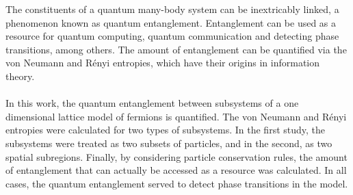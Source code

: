 \begin{singlespace}
The constituents of a quantum many-body system can be inextricably linked, a phenomenon known as quantum entanglement. Entanglement can be used as a resource for quantum computing, quantum communication and detecting phase transitions, among others. The amount of entanglement can be quantified via the von Neumann and R\'enyi entropies, which have their origins in information theory.
\\
\\
In this work, the quantum entanglement between subsystems of a one dimensional lattice model of fermions is quantified. The von Neumann and R\'enyi entropies were calculated for two types of subsystems. In the first study, the subsystems were treated as two subsets of particles, and in the second, as two spatial subregions. Finally, by considering particle conservation rules, the amount of entanglement that can actually be accessed as a resource was calculated. In all cases, the quantum entanglement served to detect phase transitions in the model. 
\end{singlespace}